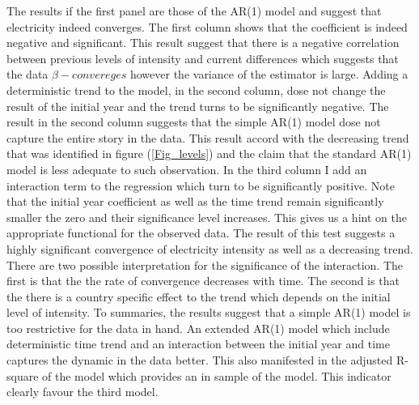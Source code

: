 \documentclass[]{amsart}
\begin{document}
The results if the first panel are those of the AR(1) model and suggest that electricity indeed converges. The first column shows that the coefficient is indeed negative and significant. This result suggest that there is a negative correlation between previous levels of intensity and current differences which suggests that the data $\beta-convereges$ however the variance of the estimator is large. Adding a deterministic trend to the model, in the second column, dose not change the result of the initial year and the trend turns to be significantly negative. The result in the second column suggests that the simple AR(1) model dose not capture the entire story in the data. This result accord with the decreasing trend that was identified in figure (\ref{Fig_levels}) and the claim that the standard AR(1) model is less adequate to such observation. In the third column I add an interaction term to the regression which turn to be significantly positive. Note that the initial year coefficient as well as the time trend remain significantly smaller the zero and their significance level increases. This gives us a hint on the appropriate functional for the observed data. The result of this test suggests a highly significant convergence of electricity intensity as well as a decreasing trend. There are two possible interpretation for the significance of the interaction. The first is that the the rate of convergence decreases with time. The second is that the there is a country specific effect to the trend which depends on the initial level of intensity. To summaries, the results suggest that a simple AR(1) model is too restrictive for the data in hand. An extended AR(1) model which include deterministic time trend and an interaction between the initial year and time captures the dynamic in the data better. This also manifested in the adjusted R-square of the model which provides an in sample of the model. This indicator clearly favour the third model.

\bigskip 
\end{document}
